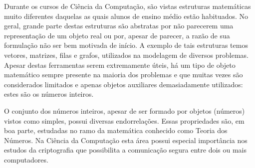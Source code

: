 
Durante os cursos de Ciência da Computação, são vistas estruturas matemáticas muito diferentes daquelas as quais alunos de ensino médio estão habituados. No geral, grande parte destas estruturas são abstratas por não parecerem uma representação de um objeto real ou por, apesar de parecer, a razão de sua formulação não ser bem motivada de início. A exemplo de tais estruturas temos vetores, matrizes, filas e grafos, utilizados na modelagem de diversos problemas. Apesar destas ferramentas serem extremamente úteis, há um tipo de objeto matemático sempre presente na maioria dos problemas e que muitas vezes são considerados limitados e apenas objetos auxiliares demasiadamente utilizados: estes são os números inteiros.

O conjunto dos números inteiros, apesar de ser formado por objetos (números) vistos como simples, possui diversas endorrelações. Essas propriedades são, em boa parte, estudadas no ramo da matemática conhecido como Teoria dos Números. Na Ciência da Computação esta área possui especial importância nos estudos da criptografia que possibilita a comunicação segura entre dois ou mais computadores. 

